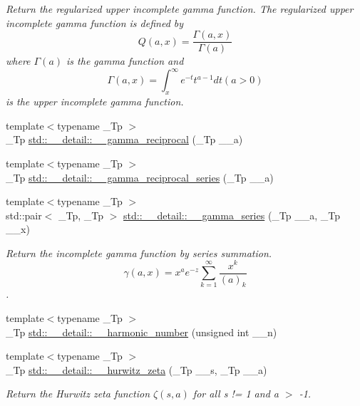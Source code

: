 \begin{DoxyCompactItemize}
\begin{DoxyCompactList}\small\item\em Return the regularized upper incomplete gamma function. The regularized upper incomplete gamma function is defined by \[ Q(a,x) = \frac{\Gamma(a,x)}{\Gamma(a)} \] where $ \Gamma(a) $ is the gamma function and \[ \Gamma(a,x) = \int_x^\infty e^{-t}t^{a-1}dt (a > 0) \] is the upper incomplete gamma function. \end{DoxyCompactList}\item 
{\footnotesize template$<$typename \+\_\+\+Tp $>$ }\\\+\_\+\+Tp \hyperlink{namespacestd_1_1____detail_a8ac187fda39e0c55614e4c58146f871c}{std\+::\+\_\+\+\_\+detail\+::\+\_\+\+\_\+gamma\+\_\+reciprocal} (\+\_\+\+Tp \+\_\+\+\_\+a)
\item 
{\footnotesize template$<$typename \+\_\+\+Tp $>$ }\\\+\_\+\+Tp \hyperlink{namespacestd_1_1____detail_a08dc6d850e2f02ff45deaa4772298cf3}{std\+::\+\_\+\+\_\+detail\+::\+\_\+\+\_\+gamma\+\_\+reciprocal\+\_\+series} (\+\_\+\+Tp \+\_\+\+\_\+a)
\item 
{\footnotesize template$<$typename \+\_\+\+Tp $>$ }\\std\+::pair$<$ \+\_\+\+Tp, \+\_\+\+Tp $>$ \hyperlink{namespacestd_1_1____detail_aa480c595e1c5b894d76398cf0e8eb02b}{std\+::\+\_\+\+\_\+detail\+::\+\_\+\+\_\+gamma\+\_\+series} (\+\_\+\+Tp \+\_\+\+\_\+a, \+\_\+\+Tp \+\_\+\+\_\+x)
\begin{DoxyCompactList}\small\item\em Return the incomplete gamma function by series summation. \[ \gamma(a,x) = x^a e^{-z}\sum_{k=1}^{\infty} \frac{x^k}{(a)_k} \]. \end{DoxyCompactList}\item 
{\footnotesize template$<$typename \+\_\+\+Tp $>$ }\\\+\_\+\+Tp \hyperlink{namespacestd_1_1____detail_aeab2857a72e09b180a765bf435f72c2e}{std\+::\+\_\+\+\_\+detail\+::\+\_\+\+\_\+harmonic\+\_\+number} (unsigned int \+\_\+\+\_\+n)
\item 
{\footnotesize template$<$typename \+\_\+\+Tp $>$ }\\\+\_\+\+Tp \hyperlink{namespacestd_1_1____detail_a63aafed798ada71b2cc58e84a6652169}{std\+::\+\_\+\+\_\+detail\+::\+\_\+\+\_\+hurwitz\+\_\+zeta} (\+\_\+\+Tp \+\_\+\+\_\+s, \+\_\+\+Tp \+\_\+\+\_\+a)
\begin{DoxyCompactList}\small\item\em Return the Hurwitz zeta function $ \zeta(s,a) $ for all s != 1 and a $>$ -\/1. \end{DoxyCompactList}\item 

\end{DoxyCompactItemize}
